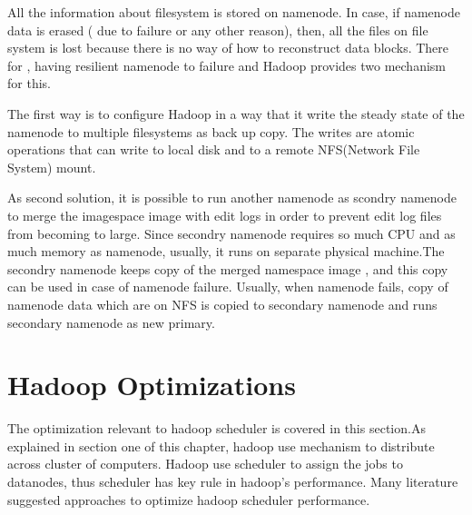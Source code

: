 All the information about filesystem is stored on namenode. In case, if namenode data is erased ( due to failure or any other reason), then, all the files on file system is lost because there is no way of how to reconstruct data blocks. There for , having resilient namenode to failure and Hadoop provides two mechanism for this.  

The first way is to configure Hadoop in a way that it write the steady state of the namenode to multiple filesystems as back up copy. The writes are atomic operations that can write to local disk and to a remote NFS(Network File System) mount.

As second solution, it is possible to run another namenode as scondry namenode to merge the imagespace image with edit logs in order to prevent edit log files from becoming to large. Since secondry namenode requires so much CPU and as much memory as namenode, usually, it runs on separate physical machine.The secondry namenode keeps copy of the merged namespace image , and this copy can be used in case of namenode failure. Usually, when namenode fails, copy of namenode data which are on NFS is copied to secondary namenode and runs secondary namenode as new primary.

   








\section{Hadoop Optimizations}

 The optimization relevant to hadoop scheduler is covered in this section.As explained in section one of this chapter, hadoop use mechanism to distribute across cluster of computers. Hadoop use scheduler to assign the jobs to datanodes, thus scheduler has key rule in hadoop's performance.  Many literature suggested approaches to optimize hadoop scheduler performance.
 
